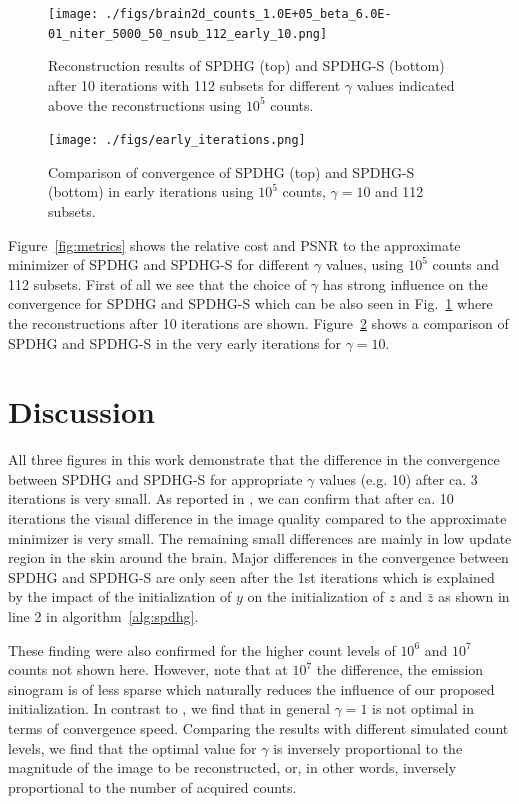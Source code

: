 \documentclass[11pt,twocolumn,twoside]{article}
\begin{document}
\begin{figure}
  \centering
  \texttt{[image: ./figs/brain2d\_counts\_1.0E+05\_beta\_6.0E-01\_niter\_5000\_50\_nsub\_112\_early\_10.png]}
  \caption{Reconstruction results of SPDHG (top) and SPDHG-S (bottom) after 10 iterations with
           112 subsets for different $\gamma$ values indicated above the reconstructions 
           using $10^5$ counts.}
  \label{fig:gamma}
\end{figure}

\begin{figure}
  \centering
  \texttt{[image: ./figs/early\_iterations.png]}
  \caption{Comparison of convergence of SPDHG (top) and SPDHG-S (bottom) in early iterations 
           using $10^5$ counts, $\gamma = 10$ and 112 subsets.}
  \label{fig:early}
\end{figure}

Figure~\ref{fig:metrics} shows the relative cost and PSNR to the approximate minimizer of 
SPDHG and SPDHG-S for different $\gamma$ values, using $10^5$ counts and 112 subsets.
First of all we see that the choice of $\gamma$ has strong influence on the convergence for
SPDHG and SPDHG-S which can be also seen in Fig.~\ref{fig:gamma} where the reconstructions
after 10 iterations are shown.
Figure~\ref{fig:early} shows a comparison of SPDHG and SPDHG-S in the very early iterations
for $\gamma = 10$.

\section{Discussion}

All three figures in this work demonstrate that the difference in the convergence between 
SPDHG and SPDHG-S for appropriate $\gamma$ values (e.g. 10) after ca. 3 iterations is very small.
As reported in \cite{Ehrhardt2019}, we can confirm that after ca. 10 iterations the visual difference
in the image quality compared to the approximate minimizer is very small.
The remaining small differences are mainly in low update region in the skin around the brain.
Major differences in the convergence between SPDHG and SPDHG-S are only seen after the
1st iterations which is explained by the impact of the initialization of $y$ on the initialization
of $z$ and $\bar{z}$ as shown in line 2 in algorithm~\ref{alg:spdhg}.

These finding were also confirmed for the higher count levels of $10^6$ and $10^7$ counts
not shown here. 
However, note that at $10^7$ the difference, the emission sinogram is of less sparse
which naturally reduces the influence of our proposed initialization.
In contrast to \cite{Ehrhardt2019}, we find that in general $\gamma = 1$ is not optimal
in terms of convergence speed. 
Comparing the results with different simulated count levels, we find that the optimal value
for $\gamma$ is inversely proportional to the magnitude of the image to be reconstructed, or, 
in other words, inversely proportional to the number of acquired counts.
\end{document}
